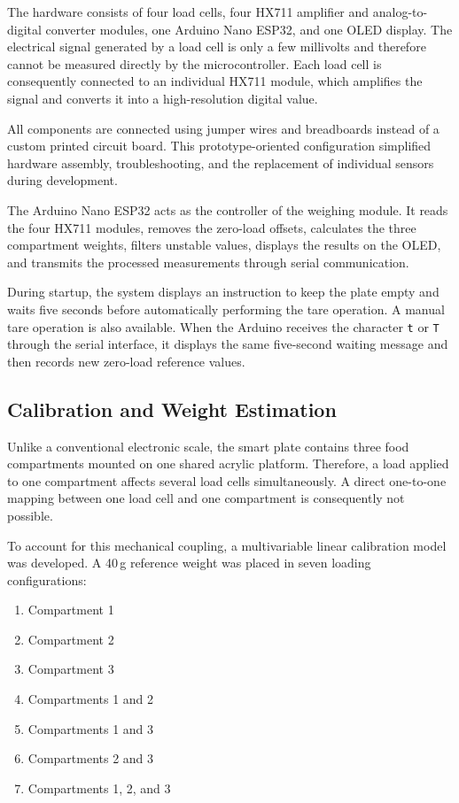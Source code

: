 \documentclass[11pt,a4paper]{article}
\begin{document}
The hardware consists of four load cells, four HX711 amplifier and analog-to-digital converter modules, one Arduino Nano ESP32, and one OLED display. The electrical signal generated by a load cell is only a few millivolts and therefore cannot be measured directly by the microcontroller. Each load cell is consequently connected to an individual HX711 module, which amplifies the signal and converts it into a high-resolution digital value.

All components are connected using jumper wires and breadboards instead of a custom printed circuit board. This prototype-oriented configuration simplified hardware assembly, troubleshooting, and the replacement of individual sensors during development.

The Arduino Nano ESP32 acts as the controller of the weighing module. It reads the four HX711 modules, removes the zero-load offsets, calculates the three compartment weights, filters unstable values, displays the results on the OLED, and transmits the processed measurements through serial communication.

During startup, the system displays an instruction to keep the plate empty and waits five seconds before automatically performing the tare operation. A manual tare operation is also available. When the Arduino receives the character \texttt{t} or \texttt{T} through the serial interface, it displays the same five-second waiting message and then records new zero-load reference values.

\subsection{Calibration and Weight Estimation}

Unlike a conventional electronic scale, the smart plate contains three food compartments mounted on one shared acrylic platform. Therefore, a load applied to one compartment affects several load cells simultaneously. A direct one-to-one mapping between one load cell and one compartment is consequently not possible.

To account for this mechanical coupling, a multivariable linear calibration model was developed. A 40\,g reference weight was placed in seven loading configurations:

\begin{enumerate}
  \item Compartment 1
  \item Compartment 2
  \item Compartment 3
  \item Compartments 1 and 2
  \item Compartments 1 and 3
  \item Compartments 2 and 3
  \item Compartments 1, 2, and 3
\end{enumerate}
\end{document}
